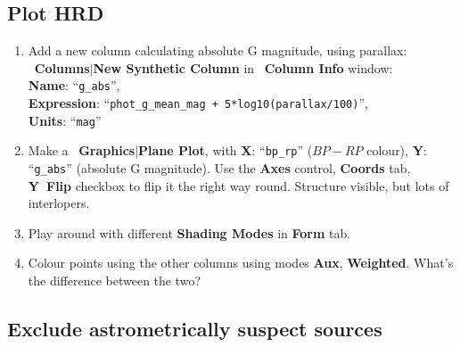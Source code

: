 \documentclass{article}
\newcommand{\buttimg}[1]
           {\mbox{\vtop{\vskip-2ex\hbox{\texttt{[image: \#1]}}}}}
\newcommand{\winfig}[2]
           {\vspace*{-0.5cm}
            \hspace*{0.5cm}\mbox{\vtop{\hbox{\texttt{[image: \#2]}}}}}
\newcommand{\lab}[1]{{\bf #1}}
\newcommand{\ma}[2]{\buttimg{#1}~\lab{#2}}
\newcommand{\mb}[3]{\buttimg{#1}~\lab{#2}$\mid$\lab{#3}}
\newcommand{\entry}[2]{\lab{#1}: ``{\tt #2}''}
\begin{document}
\subsection{Plot HRD}
\label{sec:plot-hrd}
\begin{minipage}[t]{11cm}
  \raggedright
  \begin{enumerate}
  \item Add a new column calculating absolute G magnitude, using parallax:
        \mb{plus_button.png}{Columns}{New Synthetic Column} in
        \ma{cols_button.png}{Column Info} window:\\
        \entry{Name}{g\_abs}, \\
        \entry{Expression}{phot\_g\_mean\_mag + 5*log10(parallax/100)}, \\
        \entry{Units}{mag}
        \label{item:calc-absmag}
  \item Make a \mb{planeplot_button.png}{Graphics}{Plane Plot}, with
        \entry{X}{bp\_rp} ($BP-RP$ colour), \entry{Y}{g\_abs}
        (absolute G magnitude).
        Use the \buttimg{axes_button.png} \lab{Axes} control,
        \lab{Coords} tab, \lab{Y~Flip} checkbox
        to flip it the right way round.
        Structure visible, but lots of interlopers.
  \item Play around with different \lab{Shading Modes} in \lab{Form} tab.
  \item Colour points using the other columns
        using modes \lab{Aux}, \lab{Weighted}.
        What's the difference between the two?
  \end{enumerate}
\end{minipage}
\begin{minipage}[t]{8cm}
  \vspace*{-8cm}
  \winfig{width=8cm}{hrd_excess.png}
\end{minipage}

\newpage
\subsection{Exclude astrometrically suspect sources}
\label{sec:hrd-astrom}
\end{document}
